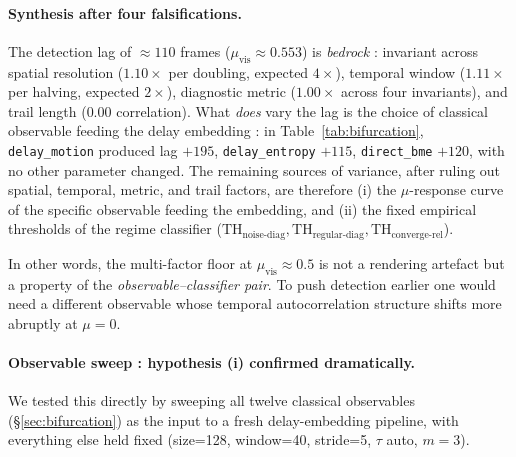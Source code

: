 \documentclass[11pt,a4paper]{article}
\begin{document}
\paragraph{Synthesis after four falsifications.}
The detection lag of $\approx 110$ frames ($\mu_{\text{vis}} \approx
0.553$) is \emph{bedrock} : invariant across spatial resolution
($1.10\times$ per doubling, expected $4\times$), temporal window
($1.11\times$ per halving, expected $2\times$), diagnostic metric
($1.00\times$ across four invariants), and trail length
($0.00$ correlation). What \emph{does} vary the lag is the choice of
classical observable feeding the delay embedding : in
Table~\ref{tab:bifurcation},
\texttt{delay\_motion} produced lag $+195$, \texttt{delay\_entropy}
$+115$, \texttt{direct\_bme} $+120$, with no other parameter changed.
The remaining sources of variance, after ruling out spatial,
temporal, metric, and trail factors, are therefore (i) the
$\mu$-response curve of the specific observable feeding the
embedding, and (ii) the fixed empirical thresholds of the regime
classifier ($\text{TH}_{\text{noise-diag}}, \text{TH}_{\text{regular-diag}},
\text{TH}_{\text{converge-rel}}$).

In other words, the multi-factor floor at $\mu_{\text{vis}} \approx
0.5$ is not a rendering artefact but a property of the
\emph{observable--classifier pair}. To push detection earlier one
would need a different observable whose temporal autocorrelation
structure shifts more abruptly at $\mu=0$.

\paragraph{Observable sweep : hypothesis (i) confirmed dramatically.}
We tested this directly by sweeping all twelve classical observables
(\S\ref{sec:bifurcation}) as the input to a fresh delay-embedding
pipeline, with everything else held fixed (size=128, window=40,
stride=5, $\tau$ auto, $m=3$).
\end{document}
